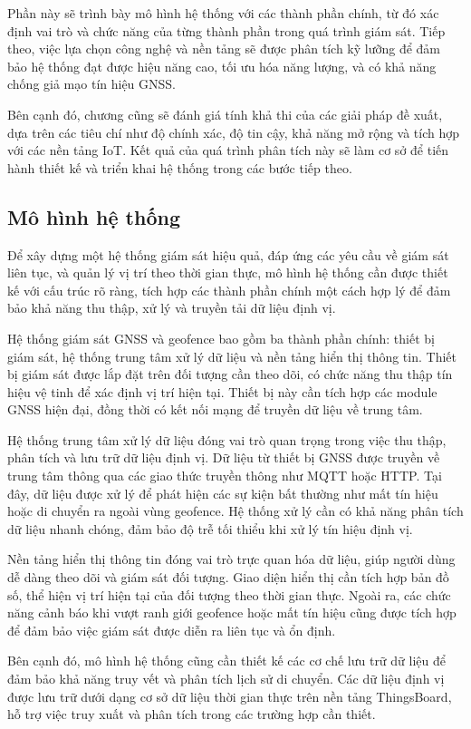 \documentclass[../DoAn.tex]{subfiles}
\begin{document}
Phần này sẽ trình bày mô hình hệ thống với các thành phần chính, từ đó xác định vai trò và chức năng của từng thành phần trong quá trình giám sát. Tiếp theo, việc lựa chọn công nghệ và nền tảng sẽ được phân tích kỹ lưỡng để đảm bảo hệ thống đạt được hiệu năng cao, tối ưu hóa năng lượng, và có khả năng chống giả mạo tín hiệu GNSS.

Bên cạnh đó, chương cũng sẽ đánh giá tính khả thi của các giải pháp đề xuất, dựa trên các tiêu chí như độ chính xác, độ tin cậy, khả năng mở rộng và tích hợp với các nền tảng IoT. Kết quả của quá trình phân tích này sẽ làm cơ sở để tiến hành thiết kế và triển khai hệ thống trong các bước tiếp theo.
\subsection{Mô hình hệ thống}
\label{subsection:2.2.1}
Để xây dựng một hệ thống giám sát hiệu quả, đáp ứng các yêu cầu về giám sát liên tục, và quản lý vị trí theo thời gian thực, mô hình hệ thống cần được thiết kế với cấu trúc rõ ràng, tích hợp các thành phần chính một cách hợp lý để đảm bảo khả năng thu thập, xử lý và truyền tải dữ liệu định vị.

Hệ thống giám sát GNSS và geofence bao gồm ba thành phần chính: thiết bị giám sát, hệ thống trung tâm xử lý dữ liệu và nền tảng hiển thị thông tin. Thiết bị giám sát được lắp đặt trên đối tượng cần theo dõi, có chức năng thu thập tín hiệu vệ tinh để xác định vị trí hiện tại. Thiết bị này cần tích hợp các module GNSS hiện đại, đồng thời có kết nối mạng để truyền dữ liệu về trung tâm.

Hệ thống trung tâm xử lý dữ liệu đóng vai trò quan trọng trong việc thu thập, phân tích và lưu trữ dữ liệu định vị. Dữ liệu từ thiết bị GNSS được truyền về trung tâm thông qua các giao thức truyền thông như MQTT hoặc HTTP. Tại đây, dữ liệu được xử lý để phát hiện các sự kiện bất thường như mất tín hiệu hoặc di chuyển ra ngoài vùng geofence. Hệ thống xử lý cần có khả năng phân tích dữ liệu nhanh chóng, đảm bảo độ trễ tối thiểu khi xử lý tín hiệu định vị.

Nền tảng hiển thị thông tin đóng vai trò trực quan hóa dữ liệu, giúp người dùng dễ dàng theo dõi và giám sát đối tượng. Giao diện hiển thị cần tích hợp bản đồ số, thể hiện vị trí hiện tại của đối tượng theo thời gian thực. Ngoài ra, các chức năng cảnh báo khi vượt ranh giới geofence hoặc mất tín hiệu cũng được tích hợp để đảm bảo việc giám sát được diễn ra liên tục và ổn định.

Bên cạnh đó, mô hình hệ thống cũng cần thiết kế các cơ chế lưu trữ dữ liệu để đảm bảo khả năng truy vết và phân tích lịch sử di chuyển. Các dữ liệu định vị được lưu trữ dưới dạng cơ sở dữ liệu thời gian thực trên nền tảng ThingsBoard, hỗ trợ việc truy xuất và phân tích trong các trường hợp cần thiết.
\end{document}
